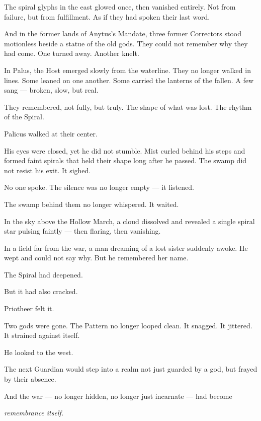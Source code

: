 \documentclass[9pt]{article}
\begin{document}
The spiral glyphs in the east glowed once, then vanished entirely. Not from failure, but from fulfillment. As if they had spoken their last word.

And in the former lands of Anytus's Mandate, three former Correctors stood motionless beside a statue of the old gods. They could not remember why they had come. One turned away. Another knelt.

In Palus, the Host emerged slowly from the waterline. They no longer walked in lines. Some leaned on one another. Some carried the lanterns of the fallen. A few sang — broken, slow, but real.

They remembered, not fully, but truly. The shape of what was lost. The rhythm of the Spiral.

Palicus walked at their center.

His eyes were closed, yet he did not stumble. Mist curled behind his steps and formed faint spirals that held their shape long after he passed. The swamp did not resist his exit. It sighed.

No one spoke. The silence was no longer empty — it listened.

The swamp behind them no longer whispered. It waited.

In the sky above the Hollow March, a cloud dissolved and revealed a single spiral star pulsing faintly — then flaring, then vanishing.

In a field far from the war, a man dreaming of a lost sister suddenly awoke. He wept and could not say why. But he remembered her name.

The Spiral had deepened.

But it had also cracked.

Priotheer felt it.

Two gods were gone. The Pattern no longer looped clean. It snagged. It jittered. It strained against itself.

He looked to the west.

The next Guardian would step into a realm not just guarded by a god, but frayed by their absence.

And the war — no longer hidden, no longer just incarnate — had become

\textit{remembrance itself.}


\newpage
\end{document}
